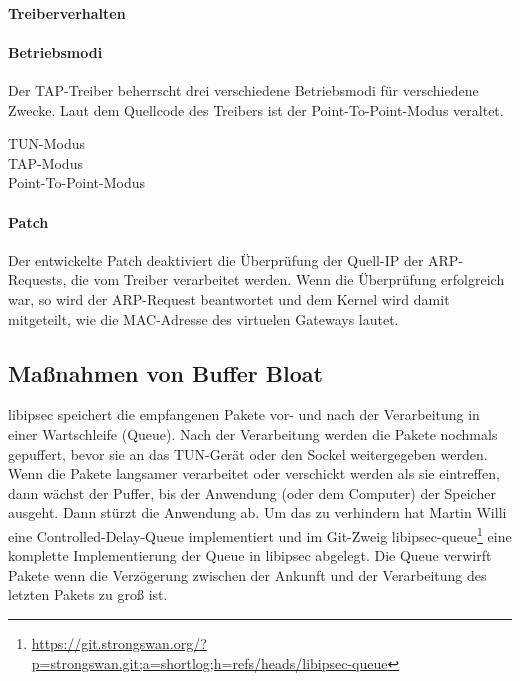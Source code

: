 \paragraph{Treiberverhalten}

\paragraph{Betriebsmodi}
Der TAP-Treiber beherrscht drei verschiedene Betriebsmodi für verschiedene Zwecke.
Laut dem Quellcode des Treibers ist der Point-To-Point-Modus veraltet.
\begin{description}
\item [TUN-Modus] 
\item [TAP-Modus]
\item [Point-To-Point-Modus]
\end{description}
\paragraph{Patch}
Der entwickelte Patch deaktiviert die Überprüfung der Quell-IP der ARP-Requests, die
vom Treiber verarbeitet werden. Wenn die Überprüfung erfolgreich war, so wird der ARP-Request
beantwortet und dem Kernel wird damit mitgeteilt, wie die MAC-Adresse des virtuelen Gateways lautet.

\subsection{Maßnahmen von Buffer Bloat}
libipsec speichert die empfangenen Pakete vor- und nach der Verarbeitung in einer Wartschleife (Queue).
Nach der Verarbeitung werden die Pakete nochmals gepuffert, bevor sie an das TUN-Gerät oder den Sockel
weitergegeben werden. Wenn die Pakete langsamer verarbeitet oder verschickt werden als sie eintreffen,
dann wächst der Puffer, bis der Anwendung (oder dem Computer) der Speicher ausgeht. Dann stürzt die Anwendung ab.
Um das zu verhindern hat Martin Willi eine Controlled-Delay-Queue implementiert und im Git-Zweig libipsec-queue\footnote{\url{https://git.strongswan.org/?p=strongswan.git;a=shortlog;h=refs/heads/libipsec-queue}} eine komplette Implementierung der Queue in libipsec abgelegt.
Die Queue verwirft Pakete wenn die Verzögerung zwischen der Ankunft und der Verarbeitung
des letzten Pakets zu groß ist.
